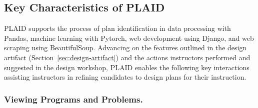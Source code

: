 
\subsection{Key Characteristics of PLAID}

PLAID supports the process of plan identification in data processing with Pandas, machine learning with Pytorch, web development using Django, and web scraping using BeautifulSoup. Advancing on the features outlined in the design artifact (Section~\ref{sec:design-artifact}) and the actions instructors performed and suggested in the design workshop, PLAID enables the following key interactions assisting instructors in refining candidates to design plans for their instruction. 


\subsubsection{Viewing Programs and Problems.}

